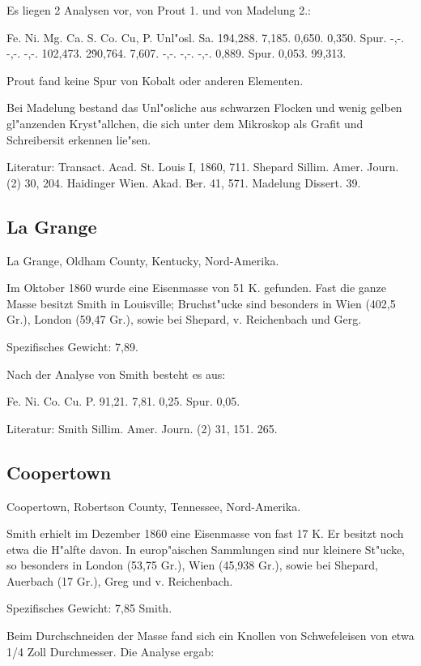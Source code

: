 \documentclass[a4paper, 11pt, oneside]{article}
\begin{document}
Es liegen 2 Analysen vor, von Prout 1. und von Madelung 2.:

Fe. Ni. Mg. Ca. S. Co. Cu, P. Unl"osl. Sa.  
1\. 94,288. 7,185. 0,650. 0,350. Spur. -,-. -,-. -,-. 102,473.  
2\. 90,764. 7,607. -,-. -,-. -,-. 0,889. Spur. 0,053. 99,313.

Prout fand keine Spur von Kobalt oder anderen Elementen.

Bei Madelung bestand das Unl"osliche aus schwarzen Flocken und wenig gelben gl"anzenden Kryst"allchen, die sich unter dem Mikroskop als Grafit und Schreibersit erkennen lie"sen.

Literatur: Transact. Acad. St. Louis I, 1860, 711. Shepard Sillim. Amer. Journ. (2) 30, 204. Haidinger Wien. Akad. Ber. 41, 571. Madelung Dissert. 39.

\subsection{La Grange}

La Grange, Oldham County, Kentucky, Nord-Amerika.

Im Oktober 1860 wurde eine Eisenmasse von 51 K. gefunden. Fast die ganze Masse besitzt Smith in Louisville; Bruchst"ucke sind besonders in Wien (402,5 Gr.), London (59,47 Gr.), sowie bei Shepard, v. Reichenbach und Gerg.

Spezifisches Gewicht: 7,89.

Nach der Analyse von Smith besteht es aus:

Fe. Ni. Co. Cu. P.  
91,21. 7,81. 0,25. Spur. 0,05.

Literatur: Smith Sillim. Amer. Journ. (2) 31, 151. 265.

\subsection{Coopertown}

Coopertown, Robertson County, Tennessee, Nord-Amerika.

Smith erhielt im Dezember 1860 eine Eisenmasse von fast 17 K. Er besitzt noch etwa die H"alfte davon. In europ"aischen Sammlungen sind nur kleinere St"ucke, so besonders in London (53,75 Gr.), Wien (45,938 Gr.), sowie bei Shepard, Auerbach (17 Gr.), Greg und v. Reichenbach.

Spezifisches Gewicht: 7,85 Smith.

Beim Durchschneiden der Masse fand sich ein Knollen von Schwefeleisen von etwa 1/4 Zoll Durchmesser. Die Analyse ergab:
\end{document}
